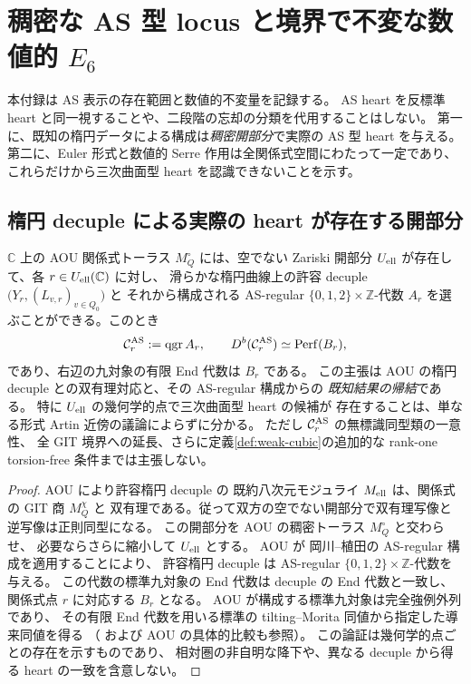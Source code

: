 \section{稠密な AS 型 locus と境界で不変な数値的 $E_6$}
\label{sec:generic-as-numerical}
本付録は AS 表示の存在範囲と数値的不変量を記録する。
AS heart を反標準 heart と同一視することや、二段階の忘却の分類を代用することはしない。
第一に、既知の楕円データによる構成は\emph{稠密開部分}で実際の AS 型 heart を与える。
第二に、Euler 形式と数値的 Serre 作用は全関係式空間にわたって一定であり、
これらだけから三次曲面型 heart を認識できないことを示す。

\subsection{楕円 decuple による実際の heart が存在する開部分}
\begin{proposition}
\label{prop:generic-as-locus}
$\mathbb C$ 上の AOU 関係式トーラス $M_Q^\circ$ には、空でない
Zariski 開部分 $U_{\rm ell}$ が存在して、各 $r\in U_{\rm ell}(\mathbb C)$ に対し、
滑らかな楕円曲線上の許容 decuple $\bigl(Y_r,(L_{v,r})_{v\in Q_0}\bigr)$ と
それから構成される AS-regular $\{0,1,2\}\times\mathbb Z$-代数
$A_r$ を選ぶことができる。このとき
\[
 \mathcal C_r^{\rm AS}:=\operatorname{qgr} A_r,\qquad
 D^b(\mathcal C_r^{\rm AS})\simeq\operatorname{Perf}(B_r),
\]
であり、右辺の九対象の有限 End 代数は $B_r$ である。
この主張は AOU の楕円 decuple との双有理対応と、その AS-regular 構成からの
\emph{既知結果の帰結}である。
特に $U_{\rm ell}$ の幾何学的点で三次曲面型 heart の候補が
存在することは、単なる形式 Artin 近傍の議論によらずに分かる。
ただし $\mathcal C_r^{\rm AS}$ の無標識同型類の一意性、
全 GIT 境界への延長、さらに定義\ref{def:weak-cubic}の追加的な
rank-one torsion-free 条件までは主張しない。
\end{proposition}
\begin{proof}
AOU\cite[Proposition~7.3, Theorem~1.1]{AOU} により許容楕円 decuple の
既約八次元モジュライ $M_{\rm ell}$ は、関係式の GIT 商 $M_Q^\chi$ と
双有理である。従って双方の空でない開部分で双有理写像と逆写像は正則同型になる。
この開部分を AOU の稠密トーラス $M_Q^\circ$ と交わらせ、
必要ならさらに縮小して $U_{\rm ell}$ とする。
AOU\cite[Lemma~7.4 and the paragraph following it]{AOU} が
岡川--植田の AS-regular 構成を適用することにより、
許容楕円 decuple は AS-regular $\{0,1,2\}\times\mathbb Z$-代数を与える。
この代数の標準九対象の End 代数は decuple の End 代数と一致し、
関係式点 $r$ に対応する $B_r$ となる。
AOU\cite[\S\S4.6, 7]{AOU} が構成する標準九対象は完全強例外列であり、
その有限 End 代数を用いる標準の tilting--Morita 同値から指定した導来同値を得る
（\cite[Definition~1.1]{OU2025} および AOU\cite[Theorem~9.4]{AOU} の具体的比較も参照）。
この論証は幾何学的点ごとの存在を示すものであり、
相対圏の非自明な降下や、異なる decuple から得る heart の一致を含意しない。
\end{proof}

